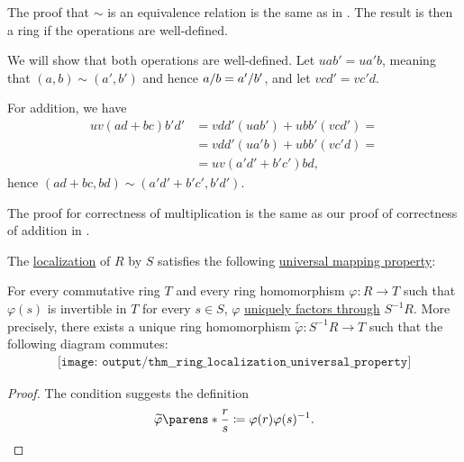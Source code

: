 \begin{defproof}
  The proof that \( {\sim} \) is an equivalence relation is the same as in . The result is then a ring if the operations are well-defined.

  We will show that both operations are well-defined. Let \( u ab' = u a'b \), meaning that \( (a, b) \sim (a', b') \) and hence \( \ifrac a b = \ifrac {a'} {b'} \), and let \( v cd' = v c'd \).

  For addition, we have
  \begin{align*}
    u v (ad + bc) b' d'
    &=
    v dd' (u ab') + u bb' (v cd')
    = \\ &=
    v dd' (u a'b) + u bb' (v c'd)
    = \\ &=
    u v (a'd' + b'c') b d,
  \end{align*}
  hence \( (ad + bc, bd) \sim (a'd' + b'c', b'd') \).

  The proof for correctness of multiplication is the same as our proof of correctness of addition in .
\end{defproof}

\begin{theorem}\label{thm:ring_localization_universal_property}
  The \hyperref[def:ring_localization]{localization} of \( R \) by \( S \) satisfies the following \hyperref[rem:universal_mapping_property]{universal mapping property}:
  \begin{displayquote}
    For every commutative ring \( T \) and every ring homomorphism \( \varphi: R \to T \) such that \( \varphi(s) \) is invertible in \( T \) for every \( s \in S \), \( \varphi \) \hyperref[def:factors_through]{uniquely factors through} \( S^{-1} R \). More precisely, there exists a unique ring homomorphism \( \widetilde{\varphi}: S^{-1} R \to T \) such that the following diagram commutes:
    \begin{equation}\label{eq:thm:ring_localization_universal_property/diagram}
      \begin{aligned}
        \texttt{[image: output/thm\_\_ring\_localization\_universal\_property]}
      \end{aligned}
    \end{equation}
  \end{displayquote}
\end{theorem}
\begin{proof}
  The condition suggests the definition
  \begin{equation*}
    \widetilde{\varphi}\parens*{ \frac r s } \coloneqq \varphi(r) \varphi(s)^{-1}.
  \end{equation*}
\end{proof}

